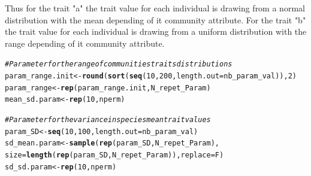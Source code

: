 \documentclass[12pt]{article}\usepackage[]{graphicx}\usepackage[]{color}
\makeatletter
\newcommand{\hlnum}[1]{\textcolor[rgb]{0.686,0.059,0.569}{#1}}%
\newcommand{\hlcom}[1]{\textcolor[rgb]{0.678,0.584,0.686}{\textit{#1}}}%
\newcommand{\hlstd}[1]{\textcolor[rgb]{0.345,0.345,0.345}{#1}}%
\newcommand{\hlkwb}[1]{\textcolor[rgb]{0.69,0.353,0.396}{#1}}%
\newcommand{\hlkwc}[1]{\textcolor[rgb]{0.333,0.667,0.333}{#1}}%
\newcommand{\hlkwd}[1]{\textcolor[rgb]{0.737,0.353,0.396}{\textbf{#1}}}%
\newenvironment{kframe}{%
 \def\at@end@of@kframe{}%
 \ifinner\ifhmode%
  \def\at@end@of@kframe{\end{minipage}}%
  \begin{minipage}{\columnwidth}%
 \fi\fi%
 \def\FrameCommand##1{\hskip\@totalleftmargin \hskip-\fboxsep
 \colorbox{shadecolor}{##1}\hskip-\fboxsep
     \hskip-\linewidth \hskip-\@totalleftmargin \hskip\columnwidth}%
 \MakeFramed {\advance\hsize-\width
   \@totalleftmargin\z@ \linewidth\hsize
   \@setminipage}}%
 {\par\unskip\endMakeFramed%
 \at@end@of@kframe}
\newenvironment{knitrout}{}{} %
\makeatother
\begin{document}
 Thus for the trait "a" the trait value for each individual is drawing from a normal distribution with the mean depending of it community attribute. For the trait "b" the trait value for each individual is drawing from a uniform distribution with the range depending of it community attribute.
 
\begin{knitrout}\small
{}\color{fgcolor}\begin{kframe}
\begin{alltt}
\hlcom{# Parameter for the range of communities traits distributions}
\hlstd{param_range.init} \hlkwb{<-} \hlkwd{round}\hlstd{(}\hlkwd{sort}\hlstd{(}\hlkwd{seq}\hlstd{(}\hlnum{10}\hlstd{,} \hlnum{200}\hlstd{,} \hlkwc{length.out} \hlstd{= nb_param_val)),} \hlnum{2}\hlstd{)}
\hlstd{param_range} \hlkwb{<-} \hlkwd{rep}\hlstd{(param_range.init, N_repet_Param)}
\hlstd{mean_sd.param} \hlkwb{<-} \hlkwd{rep}\hlstd{(}\hlnum{10}\hlstd{, nperm)}

\hlcom{# Parameter for the variance in species mean trait values}
\hlstd{param_SD} \hlkwb{<-} \hlkwd{seq}\hlstd{(}\hlnum{10}\hlstd{,} \hlnum{100}\hlstd{,}\hlkwc{length.out} \hlstd{= nb_param_val)}
\hlstd{sd_mean.param} \hlkwb{<-} \hlkwd{sample} \hlstd{(}\hlkwd{rep}\hlstd{(param_SD, N_repet_Param),}
       \hlkwc{size} \hlstd{=} \hlkwd{length}\hlstd{(}\hlkwd{rep}\hlstd{(param_SD, N_repet_Param)),} \hlkwc{replace} \hlstd{= F)}
\hlstd{sd_sd.param} \hlkwb{<-} \hlkwd{rep}\hlstd{(}\hlnum{10}\hlstd{, nperm)}
\end{alltt}
\end{kframe}
\end{knitrout}
\end{document}
